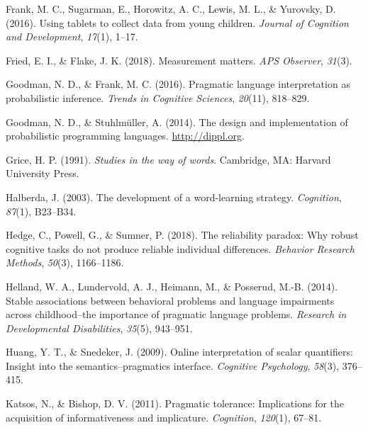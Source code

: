\documentclass[
  english,
  man,floatsintext]{apa6}
\newlength{\cslhangindent}
\newlength{\cslentryspacingunit} %
\newenvironment{CSLReferences}[2] %
 {%
  \setlength{\parindent}{0pt}
  \ifodd #1
  \let\oldpar\par
  \def\par{\hangindent=\cslhangindent\oldpar}
  \fi
  \setlength{\parskip}{#2\cslentryspacingunit}
 }%
 {}
\begin{document}
\begin{CSLReferences}{1}{0}
\leavevmode{}%
Frank, M. C., Sugarman, E., Horowitz, A. C., Lewis, M. L., \& Yurovsky, D. (2016). Using tablets to collect data from young children. \emph{Journal of Cognition and Development}, \emph{17}(1), 1--17.

\leavevmode{}%
Fried, E. I., \& Flake, J. K. (2018). Measurement matters. \emph{APS Observer}, \emph{31}(3).

\leavevmode{}%
Goodman, N. D., \& Frank, M. C. (2016). Pragmatic language interpretation as probabilistic inference. \emph{Trends in Cognitive Sciences}, \emph{20}(11), 818--829.

\leavevmode{}%
Goodman, N. D., \& Stuhlmüller, A. (2014). {The design and implementation of probabilistic programming languages}. \url{http://dippl.org}.

\leavevmode{}%
Grice, H. P. (1991). \emph{Studies in the way of words}. Cambridge, MA: Harvard University Press.

\leavevmode{}%
Halberda, J. (2003). The development of a word-learning strategy. \emph{Cognition}, \emph{87}(1), B23--B34.

\leavevmode{}%
Hedge, C., Powell, G., \& Sumner, P. (2018). The reliability paradox: Why robust cognitive tasks do not produce reliable individual differences. \emph{Behavior Research Methods}, \emph{50}(3), 1166--1186.

\leavevmode{}%
Helland, W. A., Lundervold, A. J., Heimann, M., \& Posserud, M.-B. (2014). Stable associations between behavioral problems and language impairments across childhood--the importance of pragmatic language problems. \emph{Research in Developmental Disabilities}, \emph{35}(5), 943--951.

\leavevmode{}%
Huang, Y. T., \& Snedeker, J. (2009). Online interpretation of scalar quantifiers: Insight into the semantics--pragmatics interface. \emph{Cognitive Psychology}, \emph{58}(3), 376--415.

\leavevmode{}%
Katsos, N., \& Bishop, D. V. (2011). Pragmatic tolerance: Implications for the acquisition of informativeness and implicature. \emph{Cognition}, \emph{120}(1), 67--81.


\end{CSLReferences}
\end{document}
